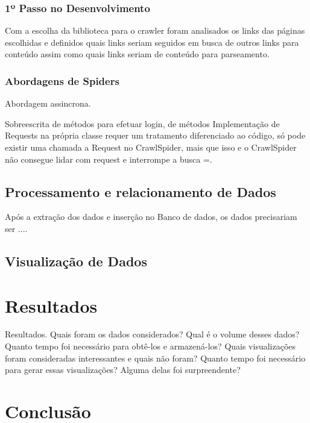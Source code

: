 \documentclass[12pt]{article}
\begin{document}
\subsubsection{1º Passo no Desenvolvimento}

Com a escolha da biblioteca para o crawler foram analisados os links das páginas escolhidas e definidos quais links seriam seguidos em busca de outros links para conteúdo assim como quais links seriam de conteúdo para parseamento. 



\subsubsection {Abordagens de Spiders}

Abordagem assincrona.

Sobreescrita de métodos para efetuar login, de métodos
Implementação de Requests na própria classe requer um tratamento diferenciado ao código, só pode existir uma chamada a Request no CrawlSpider, mais que isso e o CrawlSpider não consegue lidar com request e interrompe a busca =.



\subsection{Processamento e relacionamento de Dados}

Após a extração dos dados e inserção no Banco de dados, os dados precisariam ser ....


\subsection{Visualização de Dados}

\section{Resultados}

Resultados.
Quais foram os dados considerados? Qual é o volume desses dados? Quanto tempo foi
necessário para obtê-los e armazená-los? Quais visualizações foram consideradas interessantes e quais não
foram? Quanto tempo foi necessário para gerar essas visualizações? Alguma delas foi surpreendente?


\section{Conclusão}



\begin{thebibliography}{2}

\end{thebibliography}
\end{document}

